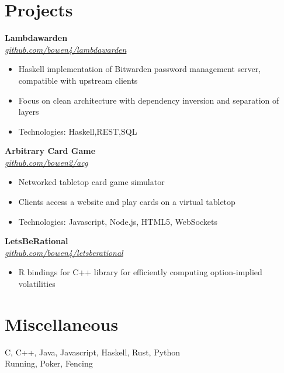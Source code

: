 \documentclass{scrartcl}
\begin{document}
\section{Projects}
\begin{resumelist}
\item \textbf{Lambdawarden}\\
\href{https://github.com/bowen4/lambdawarden/}{\textit{github.com/bowen4/lambdawarden}}
\begin{itemize}
        \item Haskell implementation of Bitwarden password management server, compatible with upstream clients
        \item Focus on clean architecture with dependency inversion and separation of layers
        \item Technologies: Haskell,\:REST,\:SQL
    \end{itemize}
\item \textbf{Arbitrary Card Game}\\
\href{https://github.com/bowen2/acg/}{\textit{github.com/bowen2/acg}}
    \begin{itemize}
        \item Networked tabletop card game simulator
        \item Clients access a website and play cards on a virtual tabletop
        \item Technologies: Javascript, Node.js, HTML5, WebSockets
    \end{itemize}
\item \textbf{LetsBeRational}\\
\href{https://github.com/bowen4/letsberational/}{\textit{github.com/bowen4/letsberational}}
    \begin{itemize}
        \item R bindings for C++ library for efficiently computing option-implied volatilities
    \end{itemize}
\end{resumelist}

\section{Miscellaneous}
 C, C++, Java, Javascript, Haskell, Rust, Python\\
 Running, Poker, Fencing
\end{document}
